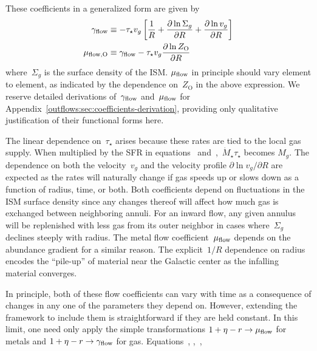 These coefficients in a generalized form are given by
\begin{subequations}\begin{align}
\gamma_{\text{flow}} &\equiv -\tau_\star v_g \left[
\frac{1}{R} +
\frac{\partial \ln \Sigma_g}{\partial R} +
\frac{\partial \ln v_g}{\partial R}
\right]
\label{outflows:eq:gamma-flow-general}
\\
\mu_{\text{flow},\text{O}} &\equiv \gamma_{\text{flow}} - \tau_\star v_g
\frac{\partial \ln Z_\text{O}}{\partial R}
\label{outflows:eq:mu-flow-general}
\end{align}\end{subequations}
where~$\Sigma_g$ is the surface density of the ISM.
$\mu_{\text{flow}}$ in principle should vary element to element, as indicated by the
dependence on~$Z_\text{O}$ in the above expression.
We reserve detailed derivations of~$\gamma_{\text{flow}}$ and~$\mu_{\text{flow}}$ for
Appendix~\ref{outflows:sec:coefficients-derivation}, providing only
qualitative justification of their functional forms here.
\par
The linear dependence on~$\tau_\star$ arises because these rates are tied to
the local gas supply.
When multiplied by the SFR in equations~
and~,~$\dot{M}_\star \tau_\star$ becomes
$M_g$.
The dependence on both the velocity~$v_g$ and the velocity profile
$\partial \ln v_g / \partial R$ are expected as the rates will naturally change
if gas speeds up or slows down as a function of radius, time, or both.
Both coefficients depend on fluctuations in the ISM surface density since any
changes thereof will affect how much gas is exchanged between neighboring
annuli.
For an inward flow, any given annulus will be replenished with less gas from
its outer neighbor in cases where~$\Sigma_g$ declines steeply with radius.
The metal flow coefficient~$\mu_{\text{flow}}$ depends on the abundance gradient for a
similar reason.
The explicit~$1 / R$ dependence on radius encodes the ``pile-up'' of material
near the Galactic center as the infalling material converges.
\par
In principle, both of these flow coefficients can vary with time as a
consequence of changes in any one of the parameters they depend on.
However, extending the~ framework to include them is
straightforward if they are held constant.
In this limit, one need only apply the simple transformations
$1 + \eta - r \rightarrow \mu_{\text{flow}}$ for metals and
$1 + \eta - r \rightarrow \gamma_{\text{flow}}$ for gas.
Equations~,
,~,
